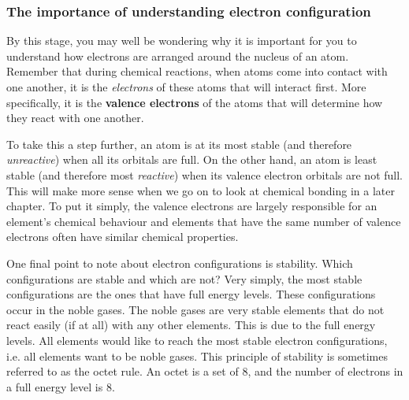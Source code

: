             \subsubsection{ The importance of understanding electron configuration}
            \nopagebreak
        \label{m38741*id260011}By this stage, you may well be wondering why it is important for you to understand how electrons are arranged around the nucleus of an atom. Remember that during chemical reactions, when atoms come into contact with one another, it is the \textsl{electrons} of these atoms that will interact first. More specifically, it is the \textbf{valence electrons} of the atoms that will determine how they react with one another.\par 
        \label{m38741*id260029}To take this a step further, an atom is at its most stable (and therefore \textsl{unreactive}) when all its orbitals are full. On the other hand, an atom is least stable (and therefore most \textsl{reactive}) when its valence electron orbitals are not full. This will make more sense when we go on to look at chemical bonding in a later chapter. To put it simply, the valence electrons are largely responsible for an element's chemical behaviour and elements that have the same number of valence electrons often have similar chemical properties.\par 
\label{m38741*eip-106}One final point to note about electron configurations is stability. Which configurations are stable and which are not? Very simply, the most stable configurations are the ones that have full energy levels. These configurations occur in the noble gases. The noble gases are very stable elements that do not react easily (if at all) with any other elements. This is due to the full energy levels. All elements would like to reach the most stable electron configurations, i.e. all elements want to be noble gases. This principle of stability is sometimes referred to as the octet rule. An octet is a set of 8, and the number of electrons in a full energy level is 8. \par \label{m38741*eip-739}
